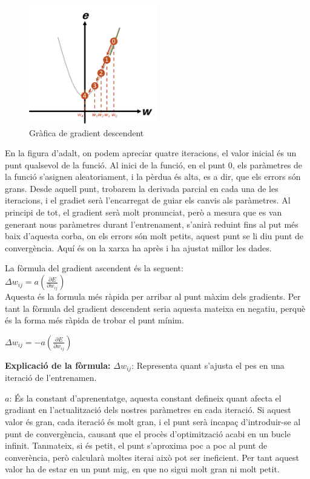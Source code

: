 \begin{figure}[H]
    \centering
    \includegraphics[width=0.5\textwidth]{./figures/gradient_descendent.png}
    \caption{Gràfica de gradient descendent}
\end{figure}

En la figura d'adalt, on podem apreciar quatre iteracions, el valor inicial és un punt qualsevol de la funció. Al inici de la funció, en el punt 0, els paràmetres de la funció s'asignen aleatoriament, i la pèrdua és alta, es a dir, que els errors són grans. Desde aquell punt, trobarem la derivada parcial en cada una de les iteracions, i el gradiet serà l'encarregat de guiar els canvis als paràmetres.
Al principi de tot, el gradient serà molt pronunciat, però a mesura que es van generant nous paràmetres durant l'entrenament, s'anirà reduint fins al put més baix d'aquesta corba, on els errors són molt petits, aquest punt se li diu punt de convergència. Aquí és on la xarxa ha après i ha ajustat millor les dades.

La fòrmula del gradient ascendent és la seguent: \\

$\Delta w_{ij} = a \left( \frac{\partial E}{\partial w_{ij}} \right)$ \\

Aquesta és la formula més ràpida per arribar al punt màxim dels gradients. Per tant la fòrmula del gradient descendent seria aquesta mateixa en negatiu, perquè és la forma més ràpida de trobar el punt mínim.

$\Delta w_{ij} = -a \left( \frac{\partial E}{\partial w_{ij}} \right)$

\textbf{Explicació de la fòrmula:}
$\Delta w_{ij}$: Representa quant s'ajusta el pes en una iteració de l'entrenamen.

$a$: És la constant d'aprenentatge, aquesta constant defineix quant afecta el gradiant en l'actualització dels nostres paràmetres en cada iteració. Si aquest valor és gran, cada iteració és molt gran, i el punt serà incapaç d'introduir-se al punt de convergència, causant que el procès d'optimització acabi en un bucle infinit. Tanmateix, si és petit, el punt s'aproxima poc a poc al punt de converència, però calcularà moltes iterai això pot ser ineficient. Per tant aquest valor ha de estar en un punt mig, en que no sigui molt gran ni molt petit.

